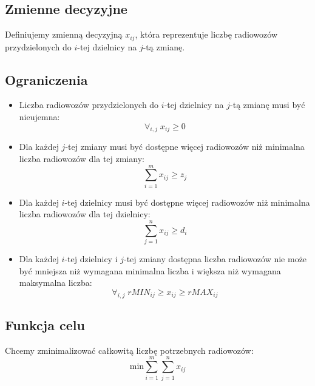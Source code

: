 \documentclass{article}
\begin{document}
\subsection{Zmienne decyzyjne}
Definiujemy zmienną decyzyjną $x_{ij}$, która reprezentuje liczbę radiowozów przydzielonych do $i$-tej dzielnicy na $j$-tą zmianę.
\subsection{Ograniczenia}
\begin{itemize}
    \item Liczba radiowozów przydzielonych do $i$-tej dzielnicy na $j$-tą zmianę musi być nieujemna:
    \[\forall_{i, j} \; x_{ij} \geq 0\]
    \item Dla każdej $j$-tej zmiany musi być dostępne więcej radiowozów niż minimalna liczba radiowozów dla tej zmiany:
    \[\sum_{i = 1}^m x_{ij} \geq z_j\]
    \item Dla każdej $i$-tej dzielnicy musi być dostępne więcej radiowozów niż minimalna liczba radiowozów dla tej dzielnicy:
    \[\sum_{j = 1}^n x_{ij} \geq d_i\]
    \item Dla każdej $i$-tej dzielnicy i $j$-tej zmiany dostępna liczba radiowozów nie może być mniejsza niż wymagana minimalna liczba i większa niż wymagana maksymalna liczba:
    \[\forall_{i, j} \; rMIN_{ij} \geq x_{ij} \geq rMAX_{ij}\]
\end{itemize}
\subsection{Funkcja celu}
Chcemy zminimalizować całkowitą liczbę potrzebnych radiowozów:
\[\text{min} \sum_{i=1}^m \sum_{j=1}^n x_{ij}\]
\end{document}
